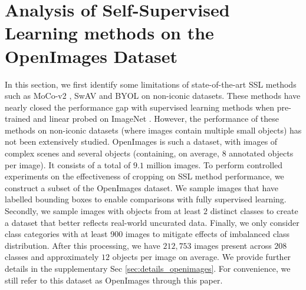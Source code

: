 \section{Analysis of Self-Supervised Learning methods on the OpenImages Dataset}

\label{sec:analysis}
In this section, we first identify some limitations of state-of-the-art SSL methods such as MoCo-v2  \citep{he2019momentum,chen2020improved}, SwAV  \citep{NEURIPS2020_70feb62b} and BYOL \citep{grill2020bootstrap} on non-iconic datasets. These methods have nearly closed the performance gap with supervised learning methods when pre-trained and linear probed on ImageNet \citep{imagenet_cvpr09}. However, the performance of these methods on non-iconic datasets (where images contain multiple small objects) has not been extensively studied. OpenImages \citep{kuznetsova2020open} is such a dataset, with images of complex scenes and several objects (containing, on average, $8$ annotated objects per image). It consists of a total of $9.1$ million images. To perform controlled experiments on the effectiveness of cropping on SSL method performance, we construct a subset of the OpenImages dataset. We sample images that have labelled bounding boxes to enable comparisons with fully supervised learning. Secondly, we sample images with objects from at least $2$ distinct classes to create a dataset that better reflects real-world uncurated data. Finally,  we only consider class categories with at least 900 images to mitigate effects of imbalanced class distribution. After this processing, we have $212,753$ images present across $208$ classes and approximately $12$ objects per image on average. We provide further details in the supplementary Sec \ref{sec:details_openimages}. For convenience, we still refer to this dataset as OpenImages through this paper. %



